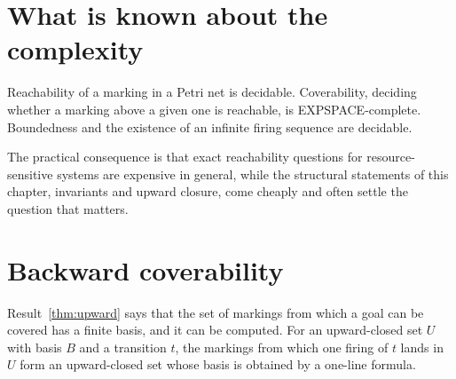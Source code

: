 \section{What is known about the complexity}

\begin{established}\label{thm:petri-complexity}
Reachability of a marking in a Petri net is decidable. Coverability, deciding whether a marking above a given one is reachable, is EXPSPACE-complete. Boundedness and the existence of an infinite firing sequence are decidable.
\end{established}

The practical consequence is that exact reachability questions for resource-sensitive systems are expensive in general, while the structural statements of this chapter, invariants and upward closure, come cheaply and often settle the question that matters.


\section{Backward coverability}\label{sec:backward}

Result~\ref{thm:upward} says that the set of markings from which a goal can be covered has a finite basis, and it can be computed. For an upward-closed set $U$ with basis $B$ and a transition $t$, the markings from which one firing of $t$ lands in $U$ form an upward-closed set whose basis is obtained by a one-line formula.

